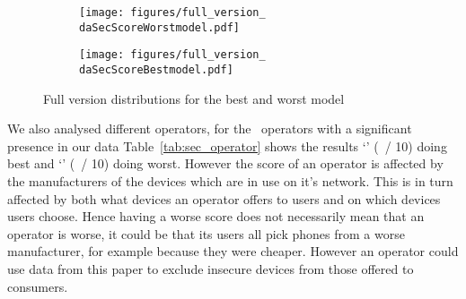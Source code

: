 \begin{figure}
 \centering
 \begin{subfigure}[b]{\columnwidth}
 \texttt{[image: figures/full\_version\_\\daSecScoreWorstmodel.pdf]}
 \caption{\daSecScoreWorstmodel}
 \label{fig:worst_model_full}
\end{subfigure}
\begin{subfigure}[b]{\columnwidth}
 \texttt{[image: figures/full\_version\_\\daSecScoreBestmodel.pdf]}
 \caption{\daSecScoreBestmodel}
 \label{fig:best_model_full}
\end{subfigure}
\caption{Full version distributions for the best and worst model}
\end{figure}

\daTabSecScoresoperator
We also analysed different operators, for the \daNumSigOperators\ operators with a significant presence in our data Table~\ref{tab:sec_operator} shows the results `\daSecScoreBestoperator' (\daSecScoreBestoperatorScore\ / 10) doing best and `\daSecScoreWorstoperator' (\daSecScoreWorstoperatorScore\ / 10) doing worst.
However the score of an operator is affected by the manufacturers of the devices which are in use on it's network.
This is in turn affected by both what devices an operator offers to users and on which devices users choose.
Hence having a worse score does not necessarily mean that an operator is worse, it could be that its users all pick phones from a worse manufacturer, for example because they were cheaper.
However an operator could use data from this paper to exclude insecure devices from those offered to consumers.


